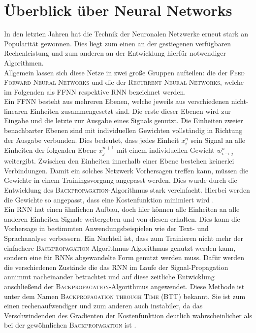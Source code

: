 \section{Überblick über Neural Networks}
In den letzten Jahren hat die Technik der Neuronalen Netzwerke erneut stark an Popularität gewonnen. Dies liegt zum einen an der gestiegenen verfügbaren Rechenleistung und zum anderen an der Entwicklung hierfür notwendiger Algorithmen.\\
Allgemein lassen sich diese Netze in zwei große Gruppen aufteilen: die der \textsc{Feed Forward Neural Networks} und die der \textsc{Recurrent Neural Networks}, welche im Folgenden als \textsc{FFNN} respektive \textsc{RNN} bezeichnet werden.\\

Ein \textsc{FFNN} besteht aus mehreren Ebenen, welche jeweils aus verschiedenen nicht-linearen Einheiten zusammengesetzt sind. Die erste dieser Ebenen wird zur Eingabe und die letzte zur Ausgabe eines Signals genutzt. Die Einheiten zweier benachbarter Ebenen sind mit individuellen Gewichten vollständig in Richtung der Ausgabe verbunden. Dies bedeutet, dass jedes Einheit $x^n_i$ sein Signal an alle Einheiten der folgenden Ebene $x^{n+1}_j$ mit einem individuellen Gewicht $w^n_{i \rightarrow j}$ weitergibt. Zwischen den Einheiten innerhalb einer Ebene bestehen keinerlei Verbindungen.
Damit ein solches Netzwerk Vorhersagen treffen kann, müssen die Gewichte in einem Trainingsvorgang angepasst werden. Dies wurde durch die Entwicklung des \textsc{Backpropagation}-Algorithmus stark vereinfacht. Hierbei werden die Gewichte so angepasst, dass eine Kostenfunktion minimiert wird \cite[S. 225-290]{bishop}.\\

Ein \textsc{RNN} hat einen ähnlichen Aufbau, doch hier können alle Einheiten an alle anderen Einheiten Signale weitergeben und von diesen erhalten. Dies kann die Vorhersage in bestimmten Anwendungsbeispielen wie der Text- und Sprachanalyse verbessern. Ein Nachteil ist, dass zum Trainieren nicht mehr der einfachere \textsc{Backpropagation}-Algorithmus Algorithmus genutzt werden kann, sondern eine für \textsc{RNN}s abgewandelte Form genutzt werden muss. Dafür werden die verschiedenen Zustände die das \textsc{RNN} im Laufe der Signal-Propagation annimmt nacheinander betrachtet und auf diese zeitliche Entwicklung anschließend der \textsc{Backpropagation}-Algorithmus angewendet. Diese Methode ist unter dem Namen \textsc{Backpropagation through Time} (BTT) bekannt. Sie ist zum einen rechenaufwendiger und zum anderen auch instabiler, da das Verschwindenden des Gradienten der Kostenfunktion deutlich wahrscheinlicher als bei der gewöhnlichen \textsc{Backpropagation} ist \citep{pascanu}.

